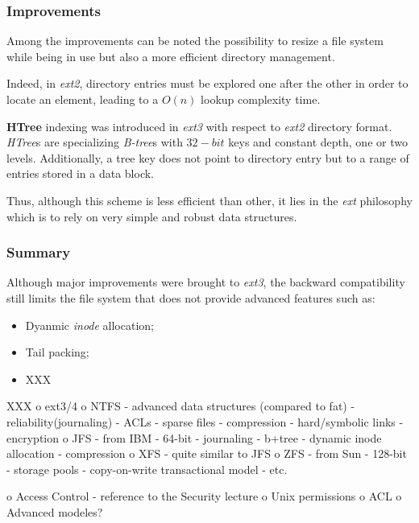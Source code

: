 
\begin{frame}
  \frametitle{Improvements}

  Among the improvements can be noted the possibility to resize a file system
  while being in use but also a more efficient directory management.

  \-

  Indeed, in \textit{ext2}, directory entries must be explored one after the
  other in order to locate an element, leading to a $O(n)$ lookup complexity
  time.

  \-

  \textbf{HTree} indexing was introduced in \textit{ext3} with respect to
  \textit{ext2} directory format. \textit{HTree}s are specializing
  \textit{B-tree}s with $32-bit$ keys and constant depth, one or two levels.
  Additionally, a tree key does not point to directory entry but to a range
  of entries stored in a data block.

  \-

  Thus, although this scheme is less efficient than other, it lies in the
  \textit{ext} philosophy which is to rely on very simple and robust data
  structures.
\end{frame}


\begin{frame}
  \frametitle{Summary}

  Although major improvements were brought to \textit{ext3}, the backward
  compatibility still limits the file system that does not provide advanced
  features such as:

  \begin{itemize}
    \item
      Dyanmic \textit{inode} allocation;
    \item
      Tail packing;
    \item
      XXX      
  \end{itemize}
\end{frame}


XXX
 o ext3/4
 o NTFS
  - advanced data structures (compared to fat)
  - reliability(journaling)
  - ACLs
  - sparse files
  - compression
  - hard/symbolic links
  - encryption
 o JFS
  - from IBM
  - 64-bit
  - journaling
  - b+tree
  - dynamic inode allocation
  - compression
 o XFS
  - quite similar to JFS
 o ZFS
  - from Sun
  - 128-bit
  - storage pools
  - copy-on-write transactional model
  - etc.

o Access Control
 - reference to the Security lecture
 o Unix permissions
 o ACL
 o Advanced modeles?

